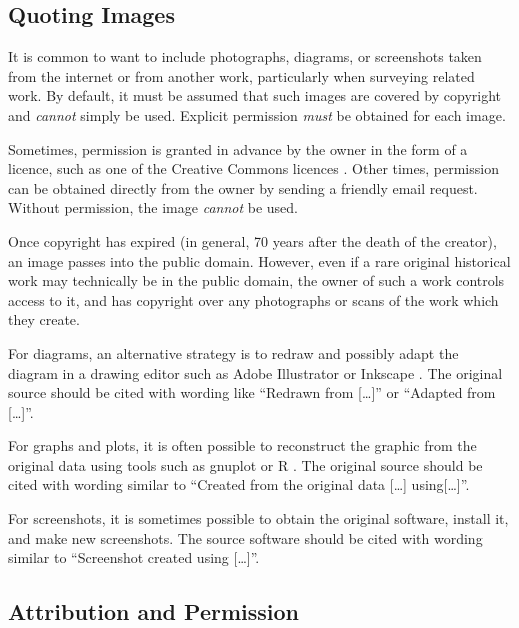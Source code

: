 \subsection{Quoting Images}

It is common to want to include photographs, diagrams, or screenshots
taken from the internet or from another work, particularly when
surveying related work. By default, it must be assumed that such
images are covered by copyright and \emph{cannot} simply be used.
Explicit permission \emph{must} be obtained for each image.

Sometimes, permission is granted in advance by the owner in the form
of a licence, such as one of the Creative Commons licences
\parencite{CC-Licences}. Other times, permission can be obtained
directly from the owner by sending a friendly email request. Without
permission, the image \emph{cannot} be used.

Once copyright has expired (in general, 70 years after the death of
the creator), an image passes into the public domain. However, even if
a rare original historical work may technically be in the public
domain, the owner of such a work controls access to it, and has
copyright over any photographs or scans of the work which they create.


For diagrams, an alternative strategy is to redraw and possibly adapt
the diagram in a drawing editor such as Adobe Illustrator
\parencite{Adobe-Illustrator} or Inkscape \parencite{Inkscape}. The original
source should be cited with wording like ``Redrawn from [\ldots]'' or
``Adapted from [\ldots]''.

For graphs and plots, it is often possible to reconstruct the graphic
from the original data using tools such as gnuplot \parencite{gnuplot} or
R \parencite{R-Project}. The original source should be cited with wording
similar to ``Created from the original data [\ldots] using[\ldots]''.

For screenshots, it is sometimes possible to obtain the original
software, install it, and make new screenshots. The source software
should be cited with wording similar to ``Screenshot created using
[\ldots]''.




\subsection{Attribution and Permission}

